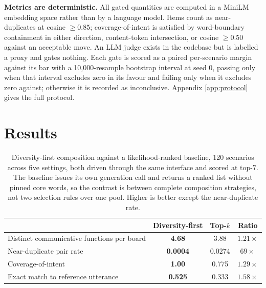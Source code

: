 \textbf{Metrics are deterministic.} All gated quantities are computed in a
MiniLM \citep{minilm} embedding space rather than by a language model. Items
count as near-duplicates at cosine ${\geq}0.85$; coverage-of-intent is satisfied
by word-boundary containment in either direction, content-token intersection, or
cosine ${\geq}0.50$ against an acceptable move. An LLM judge exists in the
codebase but is labelled a proxy and gates nothing. Each gate is scored as a
paired per-scenario margin against its bar with a 10{,}000-resample bootstrap
interval at seed 0, passing only when that interval excludes zero in its favour
and failing only when it excludes zero against; otherwise it is recorded as
inconclusive. Appendix \ref{app:protocol} gives the full protocol.

\section{Results}\label{sec:results}

\begin{table}[t]
\centering
\small
\caption{Diversity-first composition against a likelihood-ranked baseline, 120
scenarios across five settings, both driven through the same interface and
scored at top-7. The baseline issues its own generation call and returns a
ranked list without pinned core words, so the contrast is between complete
composition strategies, not two selection rules over one pool. Higher is better
except the near-duplicate rate.}
\label{tab:selection}
\begin{tabular}{lccc}
\toprule
 & \textbf{Diversity-first} & \textbf{Top-$k$} & \textbf{Ratio} \\
\midrule
Distinct communicative functions per board & \textbf{4.68} & 3.88 & $1.21\times$ \\
Near-duplicate pair rate                   & \textbf{0.0004} & 0.0274 & $69\times$ \\
Coverage-of-intent                         & \textbf{1.00} & 0.775 & $1.29\times$ \\
Exact match to reference utterance         & \textbf{0.525} & 0.333 & $1.58\times$ \\
\bottomrule
\end{tabular}
\end{table}

